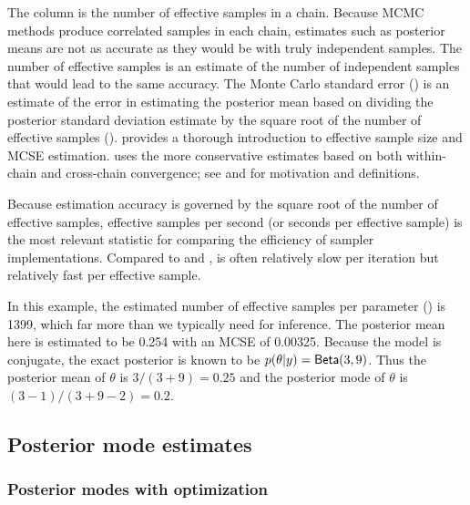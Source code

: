 \documentclass[article]{jss}
\begin{document}
The column  is the number of effective samples in a
chain.  Because MCMC methods produce correlated samples in each chain,
estimates such as posterior means are not as accurate as they would be
with truly independent samples.  The number of effective samples is an
estimate of the number of independent samples that would lead to the
same accuracy.  The Monte Carlo standard error () is an
estimate of the error in estimating the posterior mean based on
dividing the posterior standard deviation estimate by the square root
of the number of effective samples ().
\cite{Geyer:2011} provides a thorough introduction to effective sample
size and MCSE estimation.   uses the more conservative
estimates based on both within-chain and cross-chain convergence; see
\citep{GelmanEtAl:2013} and \citep{Stan:2013} for motivation and
definitions.

Because estimation accuracy is governed by the square root of the
number of effective samples, effective samples per second (or seconds
per effective sample) is the most relevant statistic for comparing the
efficiency of sampler implementations.  Compared to 
and ,  is often relatively slow per
iteration but relatively fast per effective sample.

In this example, the estimated number of effective samples per
parameter () is 1399, which far more than we typically
need for inference.  The posterior mean here is estimated to be 0.254
with an MCSE of 0.00325.  Because the model is conjugate, the exact
posterior is known to be $p(\theta|y) = \mbox{\sf Beta}(3,9)$.  Thus
the posterior mean of $\theta$ is $3/(3+9) = 0.25$ and the posterior
mode of $\theta$ is $(3-1)/(3 + 9 - 2) = 0.2$.


\subsection{Posterior mode estimates}

\subsubsection{Posterior modes with optimization}
\end{document}
